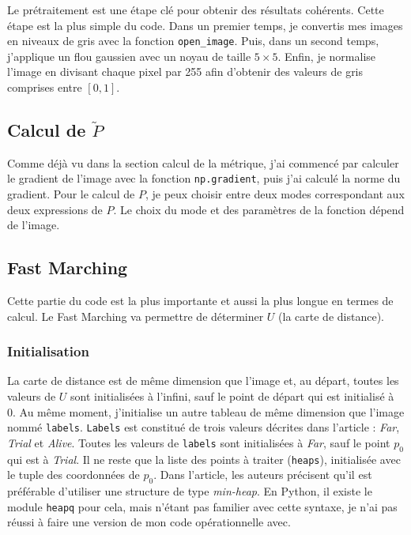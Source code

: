 \documentclass{article}
\begin{document}
Le prétraitement est une étape clé pour obtenir des résultats cohérents.
Cette étape est la plus simple du code. Dans un premier temps, je convertis mes images en
niveaux de gris avec la fonction \texttt{open\_image}. Puis, dans un second temps, j'applique un flou 
gaussien avec un noyau de taille $5 \times 5$. Enfin, je normalise l'image en divisant
chaque pixel par 255 afin d'obtenir des valeurs de gris comprises entre $[0,1]$.


\subsection{Calcul de $\tilde{P}$}
Comme déjà vu dans la section calcul de la métrique, j'ai commencé par calculer le gradient
de l'image avec la fonction \texttt{np.gradient}, puis j'ai calculé la norme du gradient.
Pour le calcul de $P$, je peux choisir entre deux modes correspondant aux deux expressions de
$P$. Le choix du mode et des paramètres de la fonction dépend de l'image.

\subsection{Fast Marching}
Cette partie du code est la plus importante et aussi la plus longue en termes de calcul.
Le Fast Marching va permettre de déterminer $U$ (la carte de distance).

\subsubsection{Initialisation}
La carte de distance est de même dimension que l'image et, au départ, toutes les valeurs de
$U$ sont initialisées à l'infini, sauf le point de départ qui est initialisé à 0. 
Au même moment, j'initialise un autre tableau de même dimension que l'image nommé 
\texttt{labels}. \texttt{Labels} est constitué de trois valeurs décrites dans 
l'article : \textit{Far}, \textit{Trial} et \textit{Alive}. Toutes les valeurs de 
\texttt{labels} sont initialisées à \textit{Far}, sauf le point $p_0$ qui est à 
\textit{Trial}. Il ne reste que la liste des points à traiter (\texttt{heaps}), 
initialisée avec le tuple des coordonnées de $p_0$. Dans l'article, les auteurs 
précisent qu'il est préférable d'utiliser une structure de type \textit{min-heap}. 
En Python, il existe le module \texttt{heapq} pour cela, mais n'étant pas familier 
avec cette syntaxe, je n'ai pas réussi à faire une version de mon code opérationnelle avec.
\end{document}
